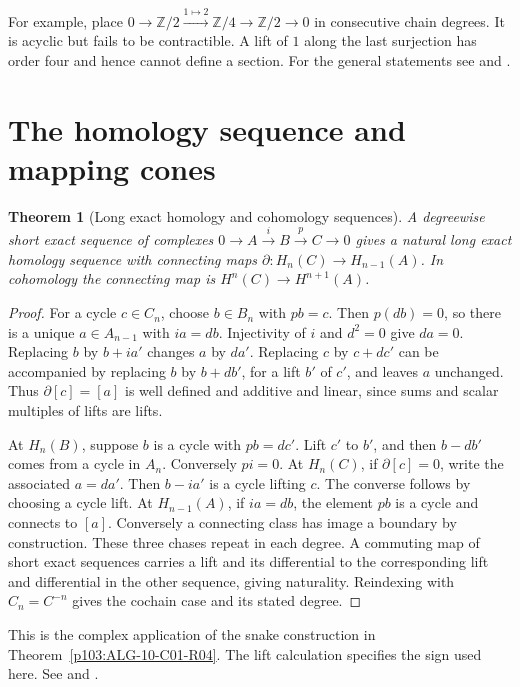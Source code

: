 \documentclass[11pt,oneside,openany]{book}
\newtheorem{theorem}{Theorem}[chapter]
\theoremstyle{definition}
\theoremstyle{remark}
\begin{document}
For example, place
\(0\to\mathbb Z/2\xrightarrow{1\mapsto 2}\mathbb Z/4
\to\mathbb Z/2\to0\) in consecutive chain degrees. It is acyclic
but fails to be contractible. A lift of \(1\) along the last
surjection has order four and hence cannot define a section.
For the general statements see \cite[\S1.4]{weibel} and
\cite[Theorem 6.14 and Proposition 6.15]{rotman}.

\section{The homology sequence and mapping cones}

\begin{theorem}[Long exact homology and cohomology sequences]
\label{p103:ALG-10-C01-R03}
A degreewise short exact sequence of complexes
\(0\to A\xrightarrow{i}B\xrightarrow{p}C\to0\) gives a natural long
exact homology sequence with connecting maps
\(\partial:H_n(C)\to H_{n-1}(A)\). In cohomology the connecting map
is \(H^n(C)\to H^{n+1}(A)\).
\end{theorem}

\begin{proof}
For a cycle \(c\in C_n\), choose \(b\in B_n\) with \(p b=c\).
Then \(p(db)=0\), so there is a unique \(a\in A_{n-1}\) with
\(i a=db\). Injectivity of \(i\) and \(d^2=0\) give \(da=0\).
Replacing \(b\) by \(b+i a'\) changes \(a\) by \(da'\).
Replacing \(c\) by \(c+dc'\) can be accompanied by replacing \(b\)
by \(b+db'\), for a lift \(b'\) of \(c'\), and leaves \(a\)
unchanged. Thus \(\partial[c]=[a]\) is well defined and additive
and linear, since sums and scalar multiples of lifts are lifts.

At \(H_n(B)\), suppose \(b\) is a cycle with \(p b=dc'\).
Lift \(c'\) to \(b'\), and then \(b-db'\) comes from a cycle in
\(A_n\). Conversely \(p i=0\). At \(H_n(C)\), if
\(\partial[c]=0\), write the associated \(a=da'\). Then \(b-i a'\)
is a cycle lifting \(c\). The converse follows by choosing a cycle
lift. At \(H_{n-1}(A)\), if \(i a=db\), the element \(p b\) is a
cycle and connects to \([a]\). Conversely a connecting class has
image a boundary by construction. These three chases repeat in
each degree. A commuting map of short exact sequences carries a lift
and its differential to the corresponding lift and differential in
the other sequence, giving naturality. Reindexing with
\(C_n=C^{-n}\) gives the cochain case and its stated degree.
\end{proof}

This is the complex application of the snake construction in
Theorem~\ref{p103:ALG-10-C01-R04}. The lift calculation specifies the
sign used here. See \cite[Theorem 1.3.1]{weibel} and
\cite[Theorems 6.10 and 6.13]{rotman}.
\end{document}
